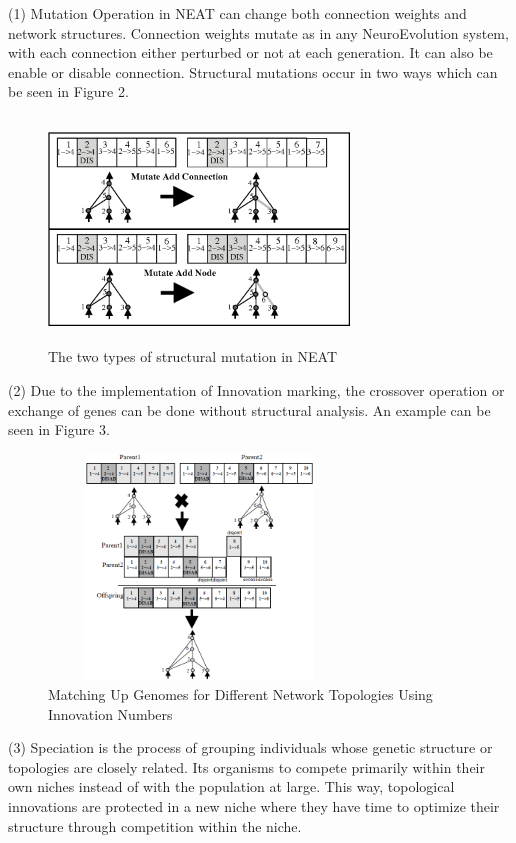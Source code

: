 \documentclass[journal]{IEEEtran}
\begin{document}
(1) Mutation Operation in NEAT can change both connection weights and network structures. Connection weights mutate as in any NeuroEvolution system, with each connection either perturbed or not at each generation. It can also be enable or disable connection. Structural mutations occur in two ways which can be seen in Figure 2.

\begin{figure}[htbp]
\begin{center}
\includegraphics[width=8cm, height=6cm]{mutate.png}
\caption{The two types of structural mutation in NEAT}
\end{center}
\end{figure}

(2) Due to the implementation of Innovation marking, the crossover operation or exchange of genes can be done without structural analysis. An example can be seen in Figure 3.

\begin{figure}[htbp]
\begin{center}
\includegraphics[width=8cm, height=6cm]{crossOver.png}
\caption{Matching Up Genomes for Different Network
Topologies Using Innovation Numbers}
\end{center}
\end{figure}

(3) Speciation is the process of grouping individuals whose genetic structure or topologies are closely related. Its organisms to compete primarily within their own niches instead of with the population at large. This way, topological innovations are protected in a new niche where they have time to optimize their structure through competition within the niche.
\end{document}
